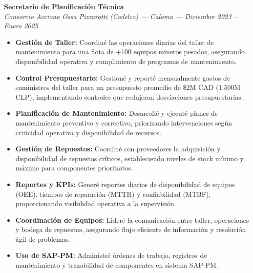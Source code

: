\documentclass[10pt,letterpaper]{article}
\begin{document}
\noindent \textbf{Secretario de Planificación Técnica} \\
\textit{Consorcio Acciona Ossa Pizzarotti (Codelco) — Calama — Diciembre 2023 – Enero 2025}
\begin{itemize}
    \item \textbf{Gestión de Taller:} Coordiné las operaciones diarias del taller de mantenimiento para una flota de +100 equipos mineros pesados, asegurando disponibilidad operativa y cumplimiento de programas de mantenimiento.
    \item \textbf{Control Presupuestario:} Gestioné y reporté mensualmente gastos de suministros del taller para un presupuesto promedio de \$2M CAD (1.500M CLP), implementando controles que redujeron desviaciones presupuestarias.
    \item \textbf{Planificación de Mantenimiento:} Desarrollé y ejecuté planes de mantenimiento preventivo y correctivo, priorizando intervenciones según criticidad operativa y disponibilidad de recursos.
    \item \textbf{Gestión de Repuestos:} Coordiné con proveedores la adquisición y disponibilidad de repuestos críticos, estableciendo niveles de stock mínimo y máximo para componentes prioritarios.
    \item \textbf{Reportes y KPIs:} Generé reportes diarios de disponibilidad de equipos (OEE), tiempos de reparación (MTTR) y confiabilidad (MTBF), proporcionando visibilidad operativa a la supervisión.
    \item \textbf{Coordinación de Equipos:} Lideré la comunicación entre taller, operaciones y bodega de repuestos, asegurando flujo eficiente de información y resolución ágil de problemas.
    \item \textbf{Uso de SAP-PM:} Administré órdenes de trabajo, registros de mantenimiento y trazabilidad de componentes en sistema SAP-PM.
\end{itemize}

\vspace{0.2cm}
\end{document}
